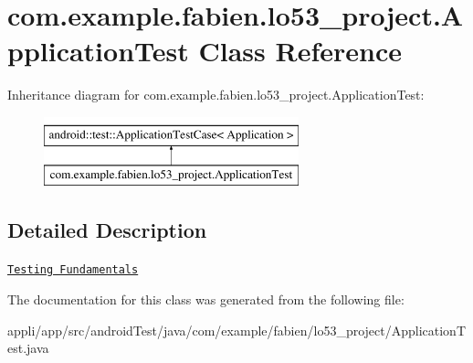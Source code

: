 \hypertarget{classcom_1_1example_1_1fabien_1_1lo53__project_1_1ApplicationTest}{\section{com.\-example.\-fabien.\-lo53\-\_\-project.\-Application\-Test Class Reference}
\label{classcom_1_1example_1_1fabien_1_1lo53__project_1_1ApplicationTest}
}
Inheritance diagram for com.\-example.\-fabien.\-lo53\-\_\-project.\-Application\-Test\-:\begin{figure}[H]
\begin{center}
\leavevmode
\includegraphics[height=2.000000cm]{classcom_1_1example_1_1fabien_1_1lo53__project_1_1ApplicationTest}
\end{center}
\end{figure}


\subsection{Detailed Description}
\href{http://d.android.com/tools/testing/testing_android.html}{\tt Testing Fundamentals} 

The documentation for this class was generated from the following file\-:\begin{DoxyCompactItemize}
\item 
appli/app/src/android\-Test/java/com/example/fabien/lo53\-\_\-project/Application\-Test.\-java\end{DoxyCompactItemize}
